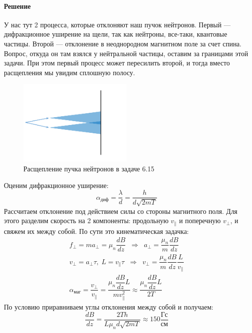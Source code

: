 \documentclass[12pt]{article}
\begin{document}
\paragraph{Решение}
У нас тут 2 процесса, которые отклоняют наш пучок нейтронов. Первый --- дифракционное уширение на щели, так как нейтроны, все-таки, квантовые частицы. Второй --- отклонение в неоднородном магнитном поле за счет спина. Вопрос, откуда он там взялся у нейтральной частицы, оставим за границами этой задачи. При этом первый процесс может пересилить второй, и тогда вместо расщепления мы увидим сплошную полосу. 
\begin{figure}[h]
    \centering
    \includegraphics[width=0.5\textwidth,height=\textheight,keepaspectratio]{Seminar_07/pics/pic_03.pdf}
    \caption{Расщепление пучка нейтронов в задаче 6.15 }
    \label{fig:sem_7_neutron_beam}
\end{figure}
Оценим дифракционное уширение:
\begin{equation*}
    \alpha_{\text{диф}}= \dfrac{\lambda}{d} = \dfrac{h}{d\sqrt{2mT}}
\end{equation*}
Рассчитаем отклонение под действием силы со стороны магнитного поля. Для этого разделим скорость на 2 компоненты: продольную $v_{\parallel}$ и поперечную $v_{\perp}$, и свяжем их между собой. По сути это кинематическая задачка:
\begin{gather*}
    f_{\perp} =m a_{\perp} = \mu_n \dfrac{dB}{dz} \;\; \Rightarrow \;\; a_{\perp} = \dfrac{\mu_n}{m} \dfrac{dB}{dz}\\
    v_{\perp} = a_{\perp} \tau, \; L=v_{\parallel}\tau \;\; \Rightarrow \;\; v_{\perp} = \dfrac{\mu_n}{m} \dfrac{dB}{dz} \dfrac{L}{v_{\parallel}}\\
    \alpha_{\text{маг}}= \dfrac{v_{\perp}}{v_{\parallel}} = \dfrac{\mu_n \dfrac{dB}{dz} L}{mv^2_{\parallel}} \approx \dfrac{\mu_n \dfrac{dB}{dz} L}{2T}
\end{gather*}
По условию приравниваем углы отклонения между собой и получаем:
\begin{equation*}
    \dfrac{dB}{dz} = \dfrac{2Th}{L\mu_nd\sqrt{2mT}} \approx 150 \dfrac{\text{Гс}}{\text{см}}
\end{equation*}
\end{document}
